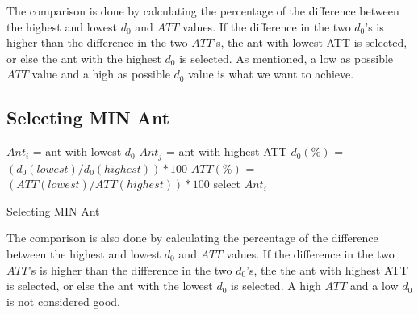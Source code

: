 The comparison is done by calculating the percentage of the difference between the highest and lowest $d_0$ and $ATT$ values. If the difference in the two $d_0$'s is higher than the difference in the two $ATT$'s, the ant with lowest ATT is selected, or else the ant with the highest $d_0$ is selected. As mentioned, a low as possible $ATT$ value and a high as possible $d_0$ value is what we want to achieve.

\subsection{Selecting MIN Ant}
\begin{algorithm}[H]
$Ant_{i}$ = ant with lowest $d_0$\;
$Ant_{j}$ = ant with highest ATT\;
{
	$d_0(\%)$ = $(d_0(lowest) / d_0(highest))*100$\;
	$ATT(\%)$ = $(ATT(lowest) / ATT(highest))*100$\;
	{
		select $Ant_{i}$
	}
}
 \caption{Selecting MIN Ant}
\end{algorithm}
The comparison is also done by calculating the percentage of the difference between the highest and lowest $d_0$ and $ATT$ values. If the difference in the two $ATT$'s is higher than the difference in the two $d_0$'s, the the ant with highest ATT is selected, or else the ant with the lowest $d_0$ is selected. A high $ATT$ and a low $d_0$ is not considered good. 

